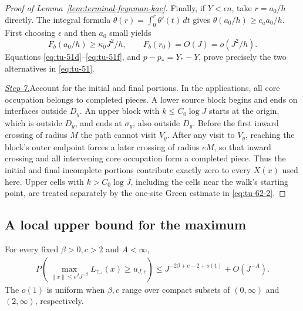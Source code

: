 \begin{proof}[Proof of Lemma~\ref{lem:terminal-feynman-kac}]
Finally, if \(Y<\epsilon n\), take \(r=a_0/h\) directly.  The integral
formula \(\theta(r)=\int_0^r\theta'(t)\,dt\) gives
\(\theta(a_0/h)\ge c_aa_0/h\).  First choosing \(\epsilon\) and then
\(a_0\) small yields
\begin{equation}
       F_b(a_0/h)\ge\kappa_0J^2/h,
       \qquad F_b(r_0)=O(J)=o(J^2/h).                        \tag{51f}\label{eq:tu-51f}
\end{equation}
Equations \eqref{eq:tu-51d}--\eqref{eq:tu-51f}, and
\(p-p_*=Y_*-Y\), prove precisely the two alternatives in \eqref{eq:tu-51}.

\smallskip\noindent
\underline{\textit{Step 7.}}\quad Account for the initial and final portions.
In the applications, all core occupation belongs to completed pieces.  A lower source block begins and ends on interfaces outside
\(D_y\).  An upper block with \(k\le C_0\log J\) starts at the origin,
which is outside \(D_y\), and ends at \(\sigma_y\), also outside
\(D_y\).  Before the first inward crossing of radius \(M\) the path
cannot visit \(V_y\).  After any visit to \(V_y\), reaching the block's
outer endpoint forces a later crossing of radius \(eM\), so that inward
crossing and all intervening core occupation form a completed piece.
Thus the initial and final incomplete portions contribute exactly zero
to every \(X(x)\) used here.  Upper cells with \(k>C_0\log J\), including
the cells near the walk's starting point, are treated separately by the
one-site Green estimate in \eqref{eq:tu-62-2}.
\end{proof}

\subsection{A local upper bound for the maximum}
\begin{proposition}\label{prop:localized-disk-upper}
For every fixed \(\beta>0,c>2\) and \(A<\infty\),
\begin{equation}
\begin{split}
 P\left(\max_{\lVert x\rVert\le e^JJ^{-\beta}}
             L_{\tau_{e^J}}(x)\ge u_{J,c}\right)
 \le J^{-2\beta+c-2+o(1)}+O(J^{-A}).                         \end{split}
\tag{53}\label{eq:tu-53}
\end{equation}
The \(o(1)\) is uniform when \(\beta,c\) range over compact subsets of
\((0,\infty)\) and \((2,\infty)\), respectively.
\end{proposition}

